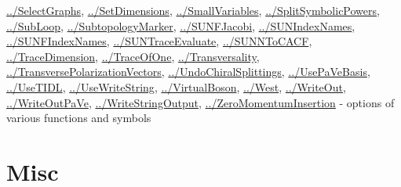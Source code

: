 \documentclass[../FeynCalcManual.tex]{subfiles}
\begin{document}
\begin{itemize}
  \hyperlink{../selectgraphs}{../SelectGraphs},
  \hyperlink{../setdimensions}{../SetDimensions},
  \hyperlink{../smallvariables}{../SmallVariables},
  \hyperlink{../splitsymbolicpowers}{../SplitSymbolicPowers},
  \hyperlink{../subloop}{../SubLoop},
  \hyperlink{../subtopologymarker}{../SubtopologyMarker},
  \hyperlink{../sunfjacobi}{../SUNFJacobi},
  \hyperlink{../sunindexnames}{../SUNIndexNames},
  \hyperlink{../sunfindexnames}{../SUNFIndexNames},
  \hyperlink{../suntraceevaluate}{../SUNTraceEvaluate},
  \hyperlink{../sunntocacf}{../SUNNToCACF},
  \hyperlink{../tracedimension}{../TraceDimension},
  \hyperlink{../traceofone}{../TraceOfOne},
  \hyperlink{../transversality}{../Transversality},
  \hyperlink{../transversepolarizationvectors}{../TransversePolarizationVectors},
  \hyperlink{../undochiralsplittings}{../UndoChiralSplittings},
  \hyperlink{../usepavebasis}{../UsePaVeBasis},
  \hyperlink{../usetidl}{../UseTIDL},
  \hyperlink{../usewritestring}{../UseWriteString},
  \hyperlink{../virtualboson}{../VirtualBoson},
  \hyperlink{../west}{../West}, \hyperlink{../writeout}{../WriteOut},
  \hyperlink{../writeoutpave}{../WriteOutPaVe},
  \hyperlink{../writestringoutput}{../WriteStringOutput},
  \hyperlink{../zeromomentuminsertion}{../ZeroMomentumInsertion} -
  options of various functions and symbols
\end{itemize}

\hypertarget{misc}{
\section{Misc}\label{misc}}
\end{document}
